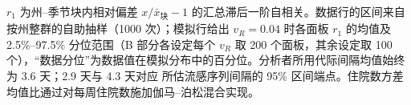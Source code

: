 \begin{table}[htbp]
\begin{tabular}{lllll}
\bottomrule
\end{tabular}
\par\smallskip
\begin{minipage}{0.95\linewidth}\scriptsize $r_1$ 为州--季节块内相对偏差 $x/\bar{x}_{\text{块}}-1$ 的汇总滞后一阶自相关。数据行的区间来自按州整群的自助抽样（1000 次）；模拟行给出 $v_R=0.04$ 时各面板 $r_1$ 的均值及 2.5\%--97.5\% 分位范围（B 部分各设定每个 $v_R$ 取 200 个面板，其余设定取 100 个），“数据分位”为数据值在模拟分布中的百分位。分析者所用代际间隔均值始终为 3.6 天；2.9 天与 4.3 天对应 \citet{cowling2009estimation} 所估流感序列间隔的 95\% 区间端点。住院数方差均值比通过对每周住院数施加伽马--泊松混合实现。\end{minipage}
\end{table}
